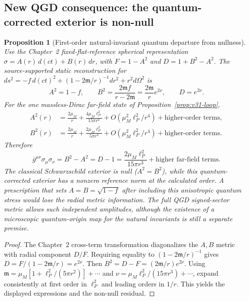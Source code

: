 \documentclass[11pt,a4paper]{article}
\newtheorem{proposition}[theorem]{Proposition}
\theoremstyle{remark}\newtheorem{remark}[theorem]{Remark}
\begin{document}
\subsection{New QGD consequence: the quantum-corrected exterior is non-null}\label{sec:v31-sector}
\begin{proposition}[First-order natural-invariant quantum departure from nullness]
Use the Chapter~2 fixed-flat-reference spherical representation
$\sigma=A(r)\,d(ct)+B(r)\,dr$, with $F=1-A^2$ and
$D=1+B^2-A^2$.  The source-supported static reconstruction for
$ds^2=-f\,d(ct)^2+(1-2\mathfrak m/r)^{-1}dr^2+r^2d\Omega^2$ is
\begin{equation}\label{eq:v31-AB}
A^2=1-f,\qquad B^2=\frac{2\mathfrak m f}{r-2\mathfrak m}
=\frac{2\mathfrak m}{r}e^{2\nu},\qquad D=e^{2\nu}.
\end{equation}
For the one massless-Dirac far-field state of Proposition~\ref{prop:v31-loop},
\begin{align}
A^2(r)&=\frac{2\mu_M}{r}
+\frac{4\mu_M\ell_P^2}{15\pi r^3}
+O(\mu_M^2\ell_P^2/r^4)+\text{higher-order terms},\\
B^2(r)&=\frac{2\mu_M}{r}
+\frac{2\mu_M\ell_P^2}{5\pi r^3}
+O(\mu_M^2\ell_P^2/r^4)+\text{higher-order terms}.
\end{align}
Therefore
\begin{equation}\label{eq:v31-nonnull}
\boxed{\bar g^{\mu\nu}\sigma_\mu\sigma_\nu
=B^2-A^2=D-1
=\frac{2\mu_M\ell_P^2}{15\pi r^3}
+\text{higher far-field terms}.}
\end{equation}
The classical Schwarzschild exterior is null ($A^2=B^2$), while
this quantum-corrected exterior has a nonzero reference norm at the
calculated order. A prescription that sets $A=B=\sqrt{1-f}$ after
including this anisotropic quantum stress would lose the radial metric
information. The full QGD signed-sector metric allows such independent
amplitudes, although the existence of a microscopic quantum-origin map
for the natural invariants is still a separate premise.
\end{proposition}
\begin{proof}
The Chapter~2 cross-term transformation diagonalizes the $A,B$ metric
with radial component $D/F$. Requiring equality to
$(1-2\mathfrak m/r)^{-1}$ gives $D=F/(1-2\mathfrak m/r)=e^{2\nu}$.
Then $B^2=D-F=(2\mathfrak m/r)e^{2\nu}$.
Using $\mathfrak m=\mu_M[1+\ell_P^2/(5\pi r^2)]+\cdots$ and
$\nu=\mu_M\ell_P^2/(15\pi r^3)+\cdots$, expand consistently
at first order in $\ell_P^2$ and leading orders in $1/r$.
This yields the displayed expressions and the non-null residual.
\end{proof}
\end{document}
